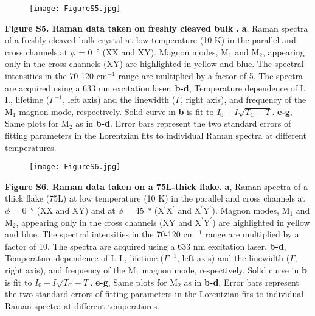 \documentclass[prl, preprint, superscriptaddress]{revtex4-1}
\begin{document}
\begin{figure}[!h]
\texttt{[image: FigureS5.jpg]}
\end{figure}
\vspace{-5pt}
\begin{footnotesize}
\noindent\textbf{Figure S5. Raman data taken on freshly cleaved bulk .} \textbf{a}, Raman spectra of a freshly cleaved bulk  crystal at low temperature (10 K) in the parallel and cross channels at $\phi$ = \SI{0}{\degree} (XX and XY). Magnon modes, $\mathrm{M}_1$ and $\mathrm{M}_2$, appearing only in the cross channels (XY) are highlighted in yellow and blue. The spectral intensities in the 70-120 $\mathrm{cm}^{-1}$ range are multiplied by a factor of 5. The spectra are acquired using a 633 nm excitation laser. \textbf{b-d}, Temperature dependence of I. I., lifetime ($\varGamma^{-1}$, left axis) and the linewidth ($\varGamma$, right axis), and frequency of the $\mathrm{M}_1$ magnon mode, respectively. Solid curve in \textbf{b} is fit to $I_0+I\sqrt{T_\mathrm{C}-T}$. \textbf{e-g}, Same plots for $\mathrm{M}_2$ as in \textbf{b-d}. Error bars represent the two standard errors of fitting parameters in the Lorentzian fits to individual Raman spectra at different temperatures. \\
\end{footnotesize}

\newpage

\begin{figure}[!h]
\texttt{[image: FigureS6.jpg]}
\end{figure}
\vspace{-5pt}
\begin{footnotesize}
\noindent\textbf{Figure S6. Raman data taken on a 75L-thick  flake.} \textbf{a}, Raman spectra of a thick  flake (75L) at low temperature (10 K) in the parallel and cross channels at $\phi$ = \SI{0}{\degree} (XX and XY) and at $\phi$ = \SI{45}{\degree} ({$\mathrm{X}^{\prime}\mathrm{X}^{\prime}$} and {$\mathrm{X}^{\prime}\mathrm{Y}^{\prime}$}). Magnon modes, $\mathrm{M}_1$ and $\mathrm{M}_2$, appearing only in the cross channels (XY and {$\mathrm{X}^{\prime}\mathrm{Y}^{\prime}$}) are highlighted in yellow and blue. The spectral intensities in the 70-120 $\mathrm{cm}^{-1}$ range are multiplied by a factor of 10. The spectra are acquired using a 633 nm excitation laser. \textbf{b-d}, Temperature dependence of I. I., lifetime ($\varGamma^{-1}$, left axis) and the linewidth ($\varGamma$, right axis), and frequency of the $\mathrm{M}_1$ magnon mode, respectively. Solid curve in \textbf{b} is fit to $I_0+I\sqrt{T_\mathrm{C}-T}$. \textbf{e-g}, Same plots for $\mathrm{M}_2$ as in \textbf{b-d}. Error bars represent the two standard errors of fitting parameters in the Lorentzian fits to individual Raman spectra at different temperatures. \\
\end{footnotesize}
\end{document}
